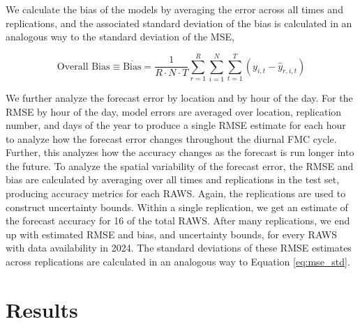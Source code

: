 \documentclass[fire,article,submit,pdftex,moreauthors]{Definitions/mdpi}
\begin{document}
We calculate the bias of the models by averaging the error across all times and replications, and the associated standard deviation of the bias is calculated in an analogous way to the standard deviation of the MSE,
\begin{linenomath}
\begin{equation}
\label{eq:bias}
    \text{Overall Bias} \equiv \overline{\text{Bias}} = \frac{1}{R\cdot N\cdot T}\sum_{r=1}^R\sum_{i=1}^{N} \sum_{t=1}^{T} (y_{i, t} - \hat y_{r, i, t})
\end{equation}
\end{linenomath}

We further analyze the forecast error by location and by hour of the day. For the RMSE by hour of the day, model errors are averaged over location, replication number, and days of the year to produce a single RMSE estimate for each hour to analyze how the forecast error changes throughout the diurnal FMC cycle. Further, this analyzes how the accuracy changes as the forecast is run longer into the future. To analyze the spatial variability of the forecast error, the RMSE and bias are calculated by averaging over all times and replications in the test set, producing accuracy metrics for each RAWS. Again, the replications are used to construct uncertainty bounds. Within a single replication, we get an estimate of the forecast accuracy for 16 of the total RAWS. After many replications, we end up with estimated RMSE and bias, and uncertainty bounds, for every RAWS with data availability in 2024. The standard deviations of these RMSE estimates across replications are calculated in an analogous way to Equation \ref{eq:mse_std}.  

\section{Results}
\label{sec:results}
\end{document}
